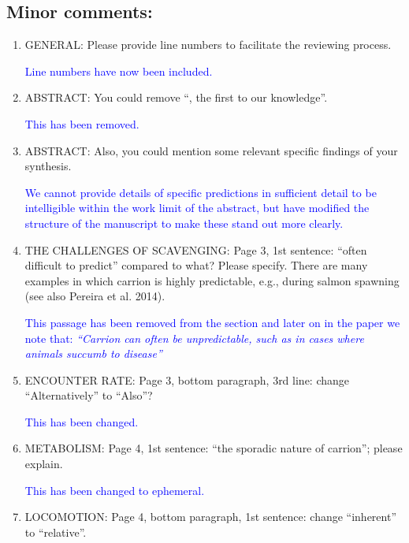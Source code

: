 \documentclass[12pt,letterpaper]{article}
\begin{document}
\begin{enumerate}
\end{enumerate}

\subsection{Minor comments:}

\begin{enumerate}

\item{GENERAL:} Please provide line numbers to facilitate the reviewing process.

\textcolor{blue}{Line numbers have now been included. }

\item{ABSTRACT:} You could remove ``, the first to our knowledge''.

\textcolor{blue}{This has been removed.}

\item{ABSTRACT:} Also, you could mention some relevant specific findings of your synthesis.

\textcolor{blue}{We cannot provide details of specific predictions in sufficient detail to be intelligible within the work limit of the abstract, but have modified the structure of the manuscript to make these stand out more clearly.} 


\item{THE CHALLENGES OF SCAVENGING:} Page 3, 1st sentence: ``often difficult to predict'' compared to what? Please specify. There are many examples in which carrion is highly predictable, e.g., during salmon spawning (see also Pereira et al. 2014).

\textcolor{blue}{This passage has been removed from the section and later on in the paper we note that: \textit{``Carrion can often be unpredictable, such as in cases where animals succumb to disease''}}

\item{ENCOUNTER RATE:} Page 3, bottom paragraph, 3rd line: change ``Alternatively'' to ``Also''?

\textcolor{blue}{This has been changed.}

\item{METABOLISM:} Page 4, 1st sentence: ``the sporadic nature of carrion''; please explain.

\textcolor{blue}{This has been changed to ephemeral.}

\item{LOCOMOTION:} Page 4, bottom paragraph, 1st sentence: change ``inherent'' to ``relative''.


\end{enumerate}
\end{document}
